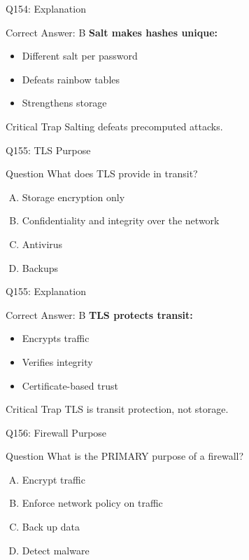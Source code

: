 \documentclass{beamer}
\begin{document}
	\begin{frame}{Q154: Explanation}
		\begin{block}{Correct Answer: B}
			\textbf{Salt makes hashes unique:}
			\begin{itemize}
				\item Different salt per password
				\item Defeats rainbow tables
				\item Strengthens storage
			\end{itemize}
		\end{block}
		\begin{alertblock}{Critical Trap}
			Salting defeats precomputed attacks.
		\end{alertblock}
	\end{frame}
	
	\begin{frame}{Q155: TLS Purpose}
		\begin{block}{Question}
			What does TLS provide in transit?
		\end{block}
		\begin{enumerate}[(A)]
			\item Storage encryption only
			\item Confidentiality and integrity over the network
			\item Antivirus
			\item Backups
		\end{enumerate}
	\end{frame}
	
	\begin{frame}{Q155: Explanation}
		\begin{block}{Correct Answer: B}
			\textbf{TLS protects transit:}
			\begin{itemize}
				\item Encrypts traffic
				\item Verifies integrity
				\item Certificate-based trust
			\end{itemize}
		\end{block}
		\begin{alertblock}{Critical Trap}
			TLS is transit protection, not storage.
		\end{alertblock}
	\end{frame}
	
	\begin{frame}{Q156: Firewall Purpose}
		\begin{block}{Question}
			What is the PRIMARY purpose of a firewall?
		\end{block}
		\begin{enumerate}[(A)]
			\item Encrypt traffic
			\item Enforce network policy on traffic
			\item Back up data
			\item Detect malware
		\end{enumerate}
	\end{frame}
	
\end{document}
